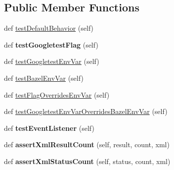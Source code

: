 \subsection*{Public Member Functions}
\begin{DoxyCompactItemize}
\item 
def \mbox{\hyperlink{classgoogletest-failfast-unittest_1_1GTestFailFastUnitTest_ad3089094d4accf5ed4e45263133255bf}{test\+Default\+Behavior}} (self)
\item 
\mbox{\label{classgoogletest-failfast-unittest_1_1GTestFailFastUnitTest_a8868f9e55d8ee268276d64656865441f}} 
def {\bfseries test\+Googletest\+Flag} (self)
\item 
def \mbox{\hyperlink{classgoogletest-failfast-unittest_1_1GTestFailFastUnitTest_a51e0d6947e2fc6e143e8bd060e45b6e3}{test\+Googletest\+Env\+Var}} (self)
\item 
def \mbox{\hyperlink{classgoogletest-failfast-unittest_1_1GTestFailFastUnitTest_a8eb621eff4b0d5738376907eba783634}{test\+Bazel\+Env\+Var}} (self)
\item 
def \mbox{\hyperlink{classgoogletest-failfast-unittest_1_1GTestFailFastUnitTest_a3a89aed053602baadb9bb32a46e6cfd3}{test\+Flag\+Overrides\+Env\+Var}} (self)
\item 
def \mbox{\hyperlink{classgoogletest-failfast-unittest_1_1GTestFailFastUnitTest_ad998af915c456cda96a09816223585f5}{test\+Googletest\+Env\+Var\+Overrides\+Bazel\+Env\+Var}} (self)
\item 
\mbox{\label{classgoogletest-failfast-unittest_1_1GTestFailFastUnitTest_a1475e3d7f80ce772c1f46e113a607f87}} 
def {\bfseries test\+Event\+Listener} (self)
\item 
\mbox{\label{classgoogletest-failfast-unittest_1_1GTestFailFastUnitTest_a9e253ee370a45c0fd976f1618bccab75}} 
def {\bfseries assert\+Xml\+Result\+Count} (self, result, count, xml)
\item 
\mbox{\label{classgoogletest-failfast-unittest_1_1GTestFailFastUnitTest_acbfb5e6a69ab38fb0fb05166f736d6d9}} 
def {\bfseries assert\+Xml\+Status\+Count} (self, status, count, xml)
\item 

\end{DoxyCompactItemize}

